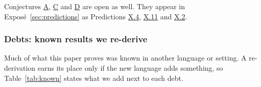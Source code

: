 Conjectures \hyperref[res:A]{A}, \hyperref[res:C]{C} and \hyperref[res:D]{D} are open as well. They appear in
Exposé~\ref{sec:predictions} as Predictions \hyperref[res:X.4]{X.4}, \hyperref[res:X.11]{X.11} and
\hyperref[res:X.2]{X.2}.

\subsubsection{Debts: known results we re-derive}\label{sec:analogy-known}

Much of what this paper proves was known in another language or setting. A re-derivation earns its place only if the new
language adds something, so Table~\ref{tab:known} states what we add next to each debt.

